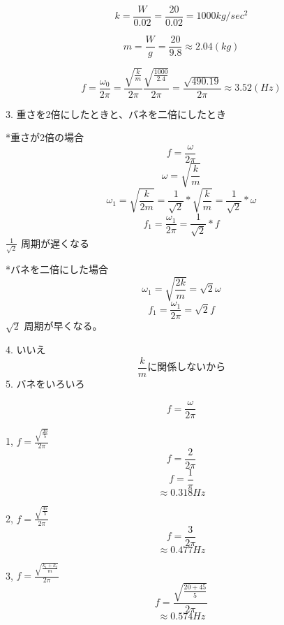 \documentclass[uplatex]{jsarticle}
\begin{document}
$$ k = \frac{W}{0.02}= \frac{20}{0.02} = 1000kg/sec^2 $$

$$ m = \frac{W}{g}= \frac{20}{9.8} \approx 2.04(kg) $$

$$ f = \frac{\omega_0}{2\pi} = \frac{\sqrt{\frac{k}{m}}}{2\pi} \frac {\sqrt{\frac{1000}{2.4}}}{2\pi} = \frac{\sqrt{490.19}}{2\pi} \approx 3.52(Hz)$$


3. 重さを2倍にしたときと、バネを二倍にしたとき



*重さが2倍の場合
$$ f = \frac{\omega}{2\pi} $$
$$ \omega = \sqrt{\frac{k}{m}}$$
$$ \omega_1 =\sqrt{\frac{k}{2m}} = \frac{1}{\sqrt{2}}* \sqrt{\frac{ k}{m}}= \frac{1}{\sqrt{2}}* \omega$$
$$ f_1 = \frac{\omega_1}{2\pi}= \frac{1}{\sqrt{2}}*f $$
$ \frac{1}{\sqrt{2}}$ 周期が遅くなる



*バネを二倍にした場合
$$ \omega_1 =\sqrt{\frac{2k}{m}} = \sqrt{2} \omega$$
$$ f_1 = \frac{\omega_1}{2\pi}= \sqrt{2}f $$
$ \sqrt{2} $ 周期が早くなる。


4. いいえ
$$ \frac{k}{m} に関係しないから$$
5. バネをいろいろ

$$ f = \frac{\omega}{2\pi} $$

1, $ f = \frac{\sqrt{\frac{20}{5}}}{2\pi} $
$$ f= \frac{2}{2\pi} $$
$$ f = \frac{1}{\pi}$$
$$ \approx {0.318}Hz $$

2, $ f = \frac{\sqrt{\frac{45}{5}}}{2\pi} $
$$ f=\frac{3}{2\pi}$$
$$ \approx{0.477}Hz $$

3, $ f = \frac{\sqrt{\frac{k_1+k_2}{m}}}{2\pi} $
$$ f = \frac{\sqrt{\frac{20+45}{5}}}{2\pi} $$
$$ \approx{0.574}Hz$$
\end{document}
